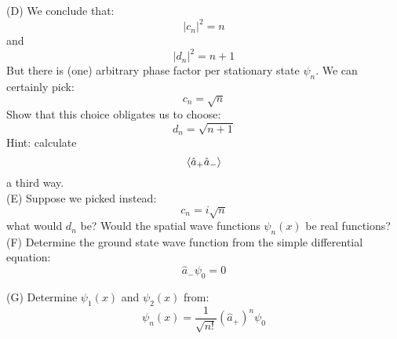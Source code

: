 \documentclass[12pt]{article}
\begin{document}
\newpage


\noindent
(D) We conclude that:
$$|c_n|^2 = n$$
and
$$|d_n|^2 = n+1$$
But there is (one) arbitrary phase factor per stationary state $\psi_n$.  We can certainly pick:
$$c_n = \sqrt{n}$$
Show that this choice obligates us to choose:
$$d_n = \sqrt{n+1}$$
Hint: calculate $$\braket{\hat{a}_+\hat{a}_-}$$ a third way.\\[5pt]

\noindent
(E) Suppose we picked instead:
$$c_n = i\sqrt{n}$$
what would $d_n$ be?  Would the spatial wave functions $\psi_n(x)$ be real functions?\\[5pt]

\noindent
(F) Determine the ground state wave function from the simple differential equation:
$$\hat{a}_- \psi_0 = 0$$

\noindent
(G) Determine $\psi_1(x)$ and $\psi_2(x)$ from:
$$\psi_n(x) = \frac{1}{\sqrt{n!}}(\hat{a}_+)^n \psi_0$$
\end{document}
